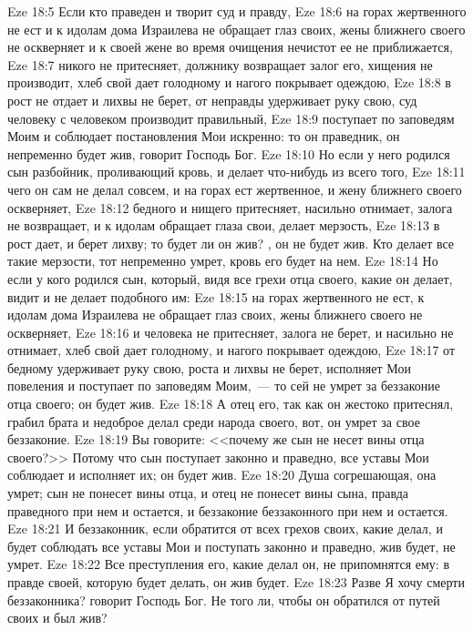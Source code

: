 \vs Eze 18:5 Если кто праведен и творит суд и правду,
\vs Eze 18:6 на горах жертвенного не ест и к идолам дома Израилева не обращает глаз своих, жены ближнего своего не оскверняет и к своей жене во время очищения нечистот ее не приближается,
\vs Eze 18:7 никого не притесняет, должнику возвращает залог его, хищения не производит, хлеб свой дает голодному и нагого покрывает одеждою,
\vs Eze 18:8 в рост не отдает и лихвы не берет, от неправды удерживает руку свою, суд человеку с человеком производит правильный,
\vs Eze 18:9 поступает по заповедям Моим и соблюдает постановления Мои искренно: то он праведник, он непременно будет жив, говорит Господь Бог.
\vs Eze 18:10 Но если у него родился сын разбойник, проливающий кровь, и делает что-нибудь из всего того,
\vs Eze 18:11 чего он сам не делал совсем, и на горах ест жертвенное, и жену ближнего своего оскверняет,
\vs Eze 18:12 бедного и нищего притесняет, насильно отнимает, залога не возвращает, и к идолам обращает глаза свои, делает мерзость,
\vs Eze 18:13 в рост дает, и берет лихву; то будет ли он жив? , он не будет жив. Кто делает все такие мерзости, тот непременно умрет, кровь его будет на нем.
\vs Eze 18:14 Но если у кого родился сын, который, видя все грехи отца своего, какие он делает, видит и не делает подобного им:
\vs Eze 18:15 на горах жертвенного не ест, к идолам дома Израилева не обращает глаз своих, жены ближнего своего не оскверняет,
\vs Eze 18:16 и человека не притесняет, залога не берет, и насильно не отнимает, хлеб свой дает голодному, и нагого покрывает одеждою,
\vs Eze 18:17 от  бедному удерживает руку свою, роста и лихвы не берет, исполняет Мои повеления и поступает по заповедям Моим,~--- то сей не умрет за беззаконие отца своего; он будет жив.
\vs Eze 18:18 А отец его, так как он жестоко притеснял, грабил брата и недоброе делал среди народа своего, вот, он умрет за свое беззаконие.
\vs Eze 18:19 Вы говорите: <<почему же сын не несет вины отца своего?>> Потому что сын поступает законно и праведно, все уставы Мои соблюдает и исполняет их; он будет жив.
\vs Eze 18:20 Душа согрешающая, она умрет; сын не понесет вины отца, и отец не понесет вины сына, правда праведного при нем и остается, и беззаконие беззаконного при нем и остается.
\vs Eze 18:21 И беззаконник, если обратится от всех грехов своих, какие делал, и будет соблюдать все уставы Мои и поступать законно и праведно, жив будет, не умрет.
\vs Eze 18:22 Все преступления его, какие делал он, не припомнятся ему: в правде своей, которую будет делать, он жив будет.
\vs Eze 18:23 Разве Я хочу смерти беззаконника? говорит Господь Бог. Не того ли, чтобы он обратился от путей своих и был жив?
